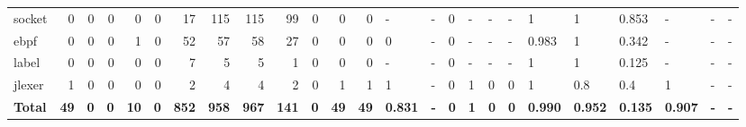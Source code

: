 \begin{table}[htp!]
\begin{adjustbox}{max width=\textwidth}
\begin{tabular}{l||rrr|rrr|rrr|rrr||lll|lll|lll|lll}
            socket           & 0                     & 0          & 0          & 0                      & 0          & 17           & 115                   & 115          & 99           & 0                      & 0           & 0           & -              & -          & 0          & -             & -          & -          & 1              & 1              & 0.853          & -              & -          & -          \\
            \rowcolor{verylightgray}
            ebpf             & 0                     & 0          & 0          & 1                      & 0          & 52           & 57                    & 58           & 27           & 0                      & 0           & 0           & 0              & -          & 0          & -             & -          & -          & 0.983          & 1              & 0.342          & -              & -          & -          \\
            label            & 0                     & 0          & 0          & 0                      & 0          & 7            & 5                     & 5            & 1            & 0                      & 0           & 0           & -              & -          & 0          & -             & -          & -          & 1              & 1              & 0.125          & -              & -          & -          \\
            \rowcolor{verylightgray}
            jlexer           & 1                     & 0          & 0          & 0                      & 0          & 2            & 4                     & 4            & 2            & 0                      & 1           & 1           & 1              & -          & 0          & 1             & 0          & 0          & 1              & 0.8            & 0.4            & 1              & -          & -          \\
            \hline
            \textbf{Total}   & \textbf{49}           & \textbf{0} & \textbf{0} & \textbf{10}            & \textbf{0} & \textbf{852} & \textbf{958}          & \textbf{967} & \textbf{141} & \textbf{0}             & \textbf{49} & \textbf{49} & \textbf{0.831} & \textbf{-} & \textbf{0} & \textbf{1}    & \textbf{0} & \textbf{0} & \textbf{0.990} & \textbf{0.952} & \textbf{0.135} & \textbf{0.907} & \textbf{-} & \textbf{-} \\
        \end{tabular}
    \end{adjustbox}
\end{table}